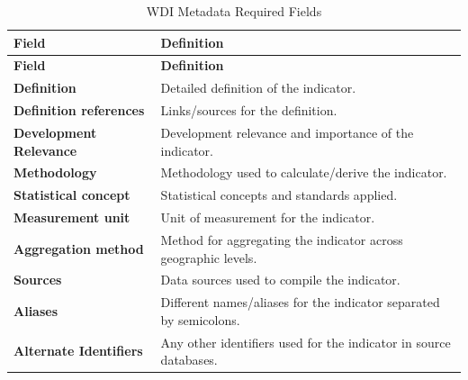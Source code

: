 \documentclass[
  11pt,
  a4paper,
  DIV=11,
  numbers=noendperiod]{scrreprt}
\begin{document}
\begin{longtable}[]{@{}
  >{\raggedright\arraybackslash}p{}
  >{\raggedright\arraybackslash}p{}@{}}
\caption{WDI Metadata Required Fields}\label{tbl-a_2}\tabularnewline
\toprule\noalign{}
\begin{minipage}[b]{\linewidth}\raggedright
\textbf{Field}
\end{minipage} & \begin{minipage}[b]{\linewidth}\raggedright
\textbf{Definition}
\end{minipage} \\
\midrule\noalign{}
\endfirsthead
\toprule\noalign{}
\begin{minipage}[b]{\linewidth}\raggedright
\textbf{Field}
\end{minipage} & \begin{minipage}[b]{\linewidth}\raggedright
\textbf{Definition}
\end{minipage} \\
\midrule\noalign{}
\endhead
\bottomrule\noalign{}
\endlastfoot
\textbf{Definition} & Detailed definition of the indicator. \\
\textbf{Definition references} & Links/sources for the definition. \\
\textbf{Development Relevance} & Development relevance and importance of
the indicator. \\
\textbf{Methodology} & Methodology used to calculate/derive the
indicator. \\
\textbf{Statistical concept} & Statistical concepts and standards
applied. \\
\textbf{Measurement unit} & Unit of measurement for the indicator. \\
\textbf{Aggregation method} & Method for aggregating the indicator
across geographic levels. \\
\textbf{Sources} & Data sources used to compile the indicator. \\
\textbf{Aliases} & Different names/aliases for the indicator separated
by semicolons. \\
\textbf{Alternate Identifiers} & Any other identifiers used for the
indicator in source databases. \\
\end{longtable}
\end{document}
